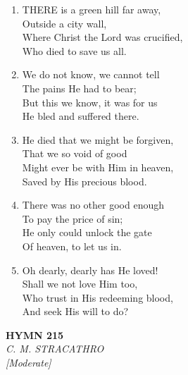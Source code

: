 \documentclass[11pt,a4paper]{article}
\begin{document}
\begin{enumerate}
    \item THERE is a green hill far away, \\
            Outside a city wall, \\
        Where Christ the Lord was crucified, \\
            Who died to save us all.

    \item We do not know, we cannot tell \\
            The pains He had to bear; \\
        But this we know, it was for us \\
            He bled and suffered there.

    \item He died that we might be forgiven, \\
            That we so void of good \\
        Might ever be with Him in heaven, \\
            Saved by His precious blood.

    \item There was no other good enough \\
            To pay the price of sin; \\
        He only could unlock the gate \\
            Of heaven, to let us in.

    \item Oh dearly, dearly has He loved! \\
            Shall we not love Him too, \\
        Who trust in His redeeming blood, \\
            And seek His will to do?

\end{enumerate}

\newpage
\begin{center}
    {\Large \textbf{HYMN 215}}
    \\
    \textit{C. M. STRACATHRO}
    \\
    \textit{\small [Moderate]}
\end{center}
\vspace{1em}
\end{document}
